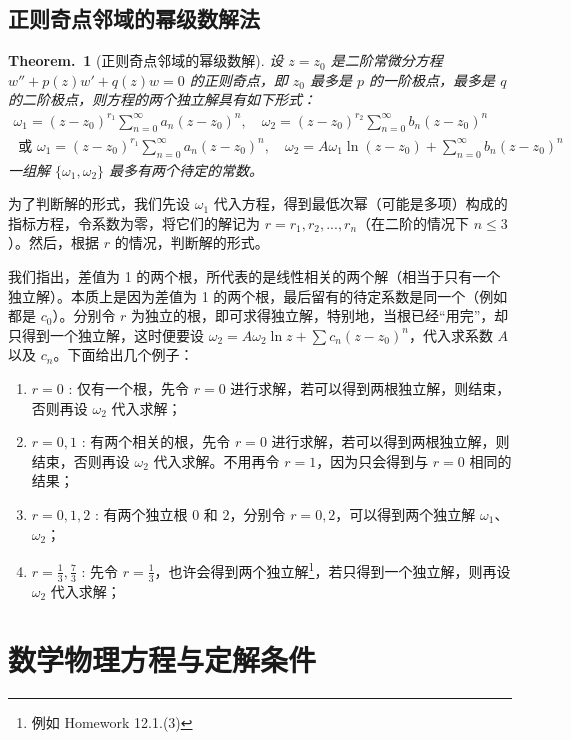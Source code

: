 \documentclass[UTF8]{report}
\theoremstyle{MyLineTheoremStyle} %
\theoremstyle{MyBlockTheoremStyle} %
\newtheorem{BlockTheorem}[LineTheorem]{Theorem.\,} %
\theoremstyle{MySubsubsectionStyle} %
\begin{document}
\section{正则奇点邻域的幂级数解法}

\begin{BlockTheorem}[正则奇点邻域的幂级数解]\label{正则奇点邻域的幂级数解}
设 $z = z_0$ 是二阶常微分方程 $w'' + p(z)w' + q(z)w = 0$ 的正则奇点，即 $z_0$ 最多是 $p$ 的一阶极点，最多是 $q$ 的二阶极点，则方程的两个独立解具有如下形式：
\begin{gather}
\omega_1 = (z - z_0)^{r_1} \sum_{n=0}^{\infty} a_n (z - z_0)^n ,\quad \omega_2 = (z - z_0)^{r_2} \sum_{n=0}^{\infty} b_n (z - z_0)^n \\ 
\text{\ 或 \ }
\omega_1 = (z - z_0)^{r_1} \sum_{n=0}^{\infty} a_n (z - z_0)^n ,\quad \omega_2 = A \omega_1 \ln (z - z_0) + \sum_{n=0}^{\infty} b_n (z - z_0)^n
\end{gather}
一组解 $\{\omega_1, \omega_2\}$ 最多有两个待定的常数。
\end{BlockTheorem}

为了判断解的形式，我们先设 $\omega_1$ 代入方程，得到最低次幂（可能是多项）构成的指标方程，令系数为零，将它们的解记为 $r = r_1, r_2, ..., r_n$（在二阶的情况下 $n \leqslant 3$）。然后，根据 $r$ 的情况，判断解的形式。

我们指出，差值为 1 的两个根，所代表的是线性相关的两个解（相当于只有一个独立解）。本质上是因为差值为 1 的两个根，最后留有的待定系数是同一个（例如都是 $c_0$）。分别令 $r$ 为独立的根，即可求得独立解，特别地，当根已经“用完”，却只得到一个独立解，这时便要设 $\omega_2 = A \omega_2 \ln z + \sum c_n (z - z_0)^n$，代入求系数 $A$ 以及 $c_n$。下面给出几个例子：
\begin{enumerate}
\item $r = 0$ : 仅有一个根，先令 $r = 0$ 进行求解，若可以得到两根独立解，则结束，否则再设 $\omega_2$ 代入求解；
\item $r = 0, 1$ : 有两个相关的根，先令 $r = 0$ 进行求解，若可以得到两根独立解，则结束，否则再设 $\omega_2$ 代入求解。不用再令 $r = 1$，因为只会得到与 $r = 0$ 相同的结果；
\item $r = 0, 1, 2$ : 有两个独立根 $0$ 和 $2$，分别令 $r = 0, 2$，可以得到两个独立解 $\omega_1$、$\omega_2$；
\item $r = \frac{1}{3}, \frac{7}{3}$ : 先令 $r = \frac{1}{3}$，也许会得到两个独立解\footnote{例如 Homework 12.1.(3)}，若只得到一个独立解，则再设 $\omega_2$ 代入求解；
\end{enumerate} 

\chapter{数学物理方程与定解条件}\thispagestyle{fancy}
\end{document}
